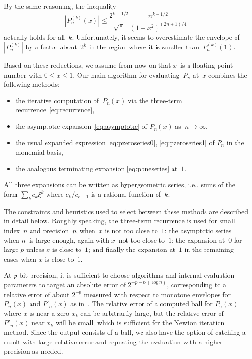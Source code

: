 \documentclass[nohypdvips,review]{siamart0216}
\newcommand{\OO}{\mathcal{O}}
\begin{document}
\begin{remark}
By the same reasoning, the inequality
\[ |P^{(k)}_n(x)| \leq \frac{2^{k+1/2}}{\sqrt{\pi}}
                       \frac{n^{k-1/2}}{(1 - x^2)^{(2n+1)/4}} \]
actually holds for all~$k$. Unfortunately, it seems to
overestimate the envelope of~$|P_n^{(k)}|$ by a factor about~$2^k$
in the region where it is smaller than~$P_n^{(k)}(1)$.
\end{remark}

Based on these reductions, we assume from now on that $x$~is a
floating-point number with $0 \leq x \leq 1$.
Our main algorithm for evaluating~$P_n$ at~$x$ combines the following
methods:
\begin{itemize}
  \item the iterative computation of~$P_n(x)$
  via the three-term recurrence~\cref{eq:recurrence},
  \item the asymptotic expansion~\eqref{eq:asymptotic}
  of $P_n(x)$ as~$n \to \infty$,
  \item the usual expanded expression \eqref{eq:pzeroseries0},
  \eqref{eq:pzeroseries1} of $P_n$ in the monomial basis,
  \item the analogous terminating expansion \eqref{eq:poneseries}
  at~$1$.
\end{itemize}
All three expansions can be written as hypergeometric
series, i.e., sums of the form $\sum_k c_k \xi^k$ where $c_k/c_{k-1}$
is a rational function of~$k$.

The constraints and heuristics used to select between these methods
are described in detail below.
Roughly speaking,
the three-term recurrence is used for small index~$n$ and precision~$p$, when~$x$
is not too close to~$1$;
the asymptotic series when $n$~is large enough, again with $x$~not too
close to~$1$;
the expansion at~$0$ for large $p$ unless $x$ is close to~$1$;
and finally the expansion at~$1$ in the remaining cases
when $x$ is close to~$1$.

At $p$-bit precision, it is sufficient to choose algorithms
and internal evaluation parameters to target
an absolute error of $2^{-p-\OO(\log n)}$, corresponding to
a relative error of about $2^{-p}$ measured with respect
to monotone envelopes for $P_n(x)$ and $P'_n(x)$ as in~\cite{Bogaert2012}.
The relative error of a computed ball for $P_n(x)$ where $x$ is near a zero $x_k$
can be arbitrarily large, but the relative error of $P'_n(x)$ near $x_k$
will be small, which is sufficient for the Newton iteration method.
Since the output consists of a ball, we also have the option of catching
a result with large relative error and repeating the evaluation with a
higher precision as needed.
\end{document}
